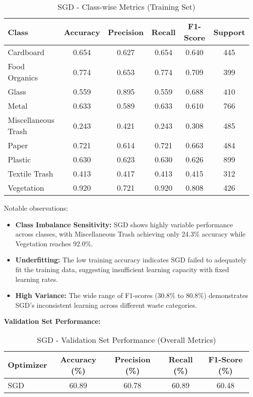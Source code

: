 \documentclass[12pt,a4paper]{article}
\begin{document}
\begin{table}[H]
\centering
\caption{SGD - Class-wise Metrics (Training Set)}
\begin{tabular}{lccccc}
\toprule
\textbf{Class} & \textbf{Accuracy} & \textbf{Precision} & \textbf{Recall} & \textbf{F1-Score} & \textbf{Support} \\
\midrule
Cardboard & 0.654 & 0.627 & 0.654 & 0.640 & 445 \\
Food Organics & 0.774 & 0.653 & 0.774 & 0.709 & 399 \\
Glass & 0.559 & 0.895 & 0.559 & 0.688 & 410 \\
Metal & 0.633 & 0.589 & 0.633 & 0.610 & 766 \\
Miscellaneous Trash & 0.243 & 0.421 & 0.243 & 0.308 & 485 \\
Paper & 0.721 & 0.614 & 0.721 & 0.663 & 484 \\
Plastic & 0.630 & 0.623 & 0.630 & 0.626 & 899 \\
Textile Trash & 0.413 & 0.417 & 0.413 & 0.415 & 312 \\
Vegetation & 0.920 & 0.721 & 0.920 & 0.808 & 426 \\
\bottomrule
\end{tabular}
\end{table}

Notable observations:
\begin{itemize}
    \item \textbf{Class Imbalance Sensitivity:} SGD shows highly variable performance across classes, with Miscellaneous Trash achieving only 24.3\% accuracy while Vegetation reaches 92.0\%.
    \item \textbf{Underfitting:} The low training accuracy indicates SGD failed to adequately fit the training data, suggesting insufficient learning capacity with fixed learning rates.
    \item \textbf{High Variance:} The wide range of F1-scores (30.8\% to 80.8\%) demonstrates SGD's inconsistent learning across different waste categories.
\end{itemize}

\textbf{Validation Set Performance:}

\begin{table}[H]
\centering
\caption{SGD - Validation Set Performance (Overall Metrics)}
\begin{tabular}{lcccc}
\toprule
\textbf{Optimizer} & \textbf{Accuracy (\%)} & \textbf{Precision (\%)} & \textbf{Recall (\%)} & \textbf{F1-Score (\%)} \\
\midrule
SGD & 60.89 & 60.78 & 60.89 & 60.48 \\
\bottomrule
\end{tabular}
\end{table}
\end{document}
